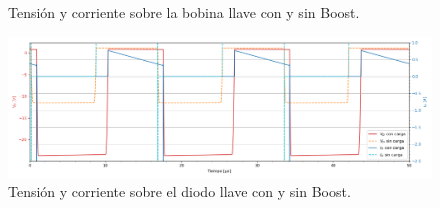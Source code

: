 \begin{figure}
\begin{minipage}{0.495\textwidth}
		\caption{Tensión y corriente sobre la bobina llave con y sin Boost.}
		\label{fig:ej3:Il_Vl_SWITCH_BOOST}
	\end{minipage}\hfill
	\begin{minipage}{0.495\textwidth}
		\centering
		\includegraphics[width=\linewidth]{ImagenesEjercicio-3/id-vd-1v3}
		\caption{Tensión y corriente sobre el diodo llave con y sin Boost.}
		\label{fig:ej3:Id_Vd_SWITCH_BOOST}
	\end{minipage}\hfill
\end{figure}




%
